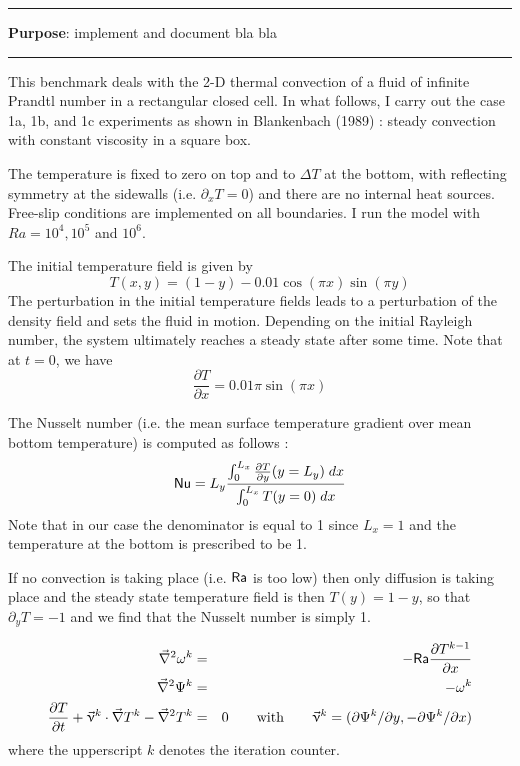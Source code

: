 \par\noindent\rule{\textwidth}{0.4pt}

{\bf \color{teal} Purpose}: implement and document bla bla 

\par\noindent\rule{\textwidth}{0.4pt}



This benchmark deals with the 2-D thermal convection of a fluid 
of infinite Prandtl number in a rectangular closed cell.
In what follows, I carry out the case 1a, 1b, and 1c experiments as shown in 
Blankenbach \etal (1989) \cite{blbc89}:
steady convection with constant viscosity in a square box.

The temperature is fixed to zero on top and to $\Delta T$ at the bottom, 
with reflecting symmetry at the sidewalls (i.e. $\partial_x T=0$) 
and there are no internal heat sources. 
Free-slip conditions are implemented on all boundaries. 
I run the model with $Ra=10^4,10^{5}$ and $10^6$.

The initial temperature field is given by 
\begin{equation}
T(x,y)=(1-y) - 0.01\cos(\pi x) \sin(\pi y)
\end{equation}
The perturbation in the initial temperature fields leads to 
a perturbation of the density field and sets the fluid in motion. 
Depending on the initial Rayleigh number, the system ultimately reaches a 
steady state after some time. 
Note that at $t=0$, we have
\[
\frac{\partial T}{\partial x} = 0.01 \pi \sin(\pi x)
\]

The Nusselt number (i.e. the mean surface temperature gradient over 
mean bottom temperature)
is computed as follows \cite{blbc89}:
\begin{equation}
{\mathsf{Nu}} = L_y \frac{\int_0^{L_x} \frac{\partial T}{\partial y}(y=L_y) \; dx  }{\int_0^{L_x} T(y=0) \; dx}
\label{eqNu}
\end{equation}
Note that in our case the denominator is equal to 1 since $L_x=1$ 
and the temperature at the bottom is prescribed to be 1.

If no convection is taking place (i.e. ${\mathsf{Ra}}$ is too low) then 
only diffusion is taking place 
and the steady state temperature field is then $T(y)=1-y$, 
so that $\partial_y T=-1$ and we find that the Nusselt number is simply 1.

\begin{eqnarray}
\vec\nabla^2 \omega^{k} &=& -{\mathsf{Ra}} \frac{\partial T^{k-1}}{\partial x} \\
\vec\nabla^2 \Psi^{k}   &=&  -\omega^{k} \\
\frac{\partial T}{\partial t} + \vec\upnu^k \cdot \vec\nabla T^{k} - \vec\nabla^2 T^k   &=& 0
\qquad \text{with} \qquad 
\vec\upnu^k=(\partial \Psi^k/\partial y,-\partial \Psi^k / \partial x)
\end{eqnarray}
where the upperscript $k$ denotes the iteration counter.

